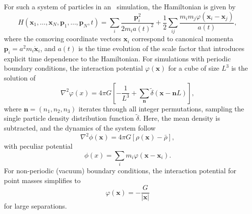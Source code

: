 For such a system of particles in an \nbody\ simulation, the Hamiltonian is given by
\begin{equation}
	H(\mathbf{x}_{1}, \ldots, \mathbf{x}_{N}, \mathbf{p}_{1}, \ldots, \mathbf{p}_{N}, t)
	= \sum_{i} \frac{\mathbf{p}_{i}^{2}}{2 m_{i} a(t)^{2}} + \frac{1}{2} \sum_{ij} \frac{m_{i} m_{j} \varphi(\mathbf{x}_{i} - \mathbf{x}_{j})}{a(t)},
\end{equation}
where the comoving coordinate vectors $\mathbf{x}_{i}$ correspond to canonical momenta $\mathbf{p}_{i} = a^{2} m_{i} \mathbf{\dot{x}}_{i}$, and $a(t)$ is the time evolution of the scale factor that introduces explicit time dependence to the Hamiltonian.  For simulations with periodic boundary conditions, the interaction potential $\varphi(\mathbf{x})$ for a cube of size $L^{3}$ is the solution of
\begin{equation} \label{eq:computational_theory--nbody_simulations--discrete_poisson}
	\nabla^{2} \varphi(x) = 4 \pi G \left[ -\frac{1}{L^{3}} + \sum_{\mathbf{n}} \tilde{\delta}(\mathbf{x} - \mathbf{n}L) \right],
\end{equation}
where $\mathbf{n} = (n_{1}, n_{2}, n_{3})$ iterates through all integer permutations, sampling the single particle density distribution function $\tilde{\delta}$.  Here, the mean density is subtracted, and the dynamics of the system follow
\begin{equation}
	\nabla^{2} \phi(\mathbf{x}) = 4 \pi G [\rho(\mathbf{x}) - \bar{\rho}],
\end{equation}
with peculiar potential
\begin{equation}
	\phi(x) = \sum_{i} m_{i} \varphi(\mathbf{x} - \mathbf{x}_{i}).
\end{equation}
For non-periodic (vacuum) boundary conditions, the interaction potential for point masses simplifies to 
\begin{equation}
	\varphi(\mathbf{x}) = -\frac{G}{|\mathbf{x}|}
\end{equation}
for large separations.

